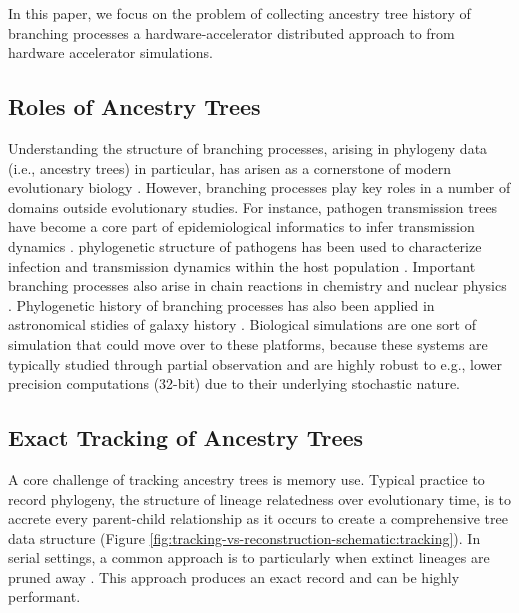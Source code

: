 In this paper, we focus on the problem of collecting ancestry tree history of branching processes a hardware-accelerator distributed approach to from hardware accelerator simulations.

\subsection{Roles of Ancestry Trees}

Understanding the structure of branching processes, arising in phylogeny data (i.e., ancestry trees) in particular, has arisen as a cornerstone of modern evolutionary biology \citep{faithConservationEvaluationPhylogenetic1992, STAMATAKIS2005phylogenetics,frenchHostPhylogenyShapes2023,kim2006discovery,lewinsohnStatedependentEvolutionaryModels2023a,lenski2003evolutionary}.
However, branching processes play key roles in a number of domains outside evolutionary studies.
For instance, pathogen transmission trees have become a core part of epidemiological informatics to infer transmission dynamics \citep{TODO}.
phylogenetic structure of pathogens has been used to characterize infection and transmission dynamics within the host population \citep{giardina2017inference,voznica2022deep}.
Important branching processes also arise in chain reactions in chemistry and nuclear physics \citep{UsonFornies1999,Pazsit2007}.
Phylogenetic history of branching processes has also been applied in astronomical stidies of galaxy history \citep{Jofr2017}.
Biological simulations are one sort of simulation that could move over to these platforms, because these systems are typically studied through partial observation and are highly robust to e.g., lower precision computations (32-bit) due to their underlying stochastic nature.

\subsection{Exact Tracking of Ancestry Trees}

A core challenge of tracking ancestry trees is memory use.
Typical practice to record phylogeny, the structure of lineage relatedness over evolutionary time, is to accrete every parent-child relationship as it occurs to create a comprehensive tree data structure \citep{moreno2024algorithms} (Figure \ref{fig:tracking-vs-reconstruction-schematic:tracking}).
In serial settings, a common approach is to particularly when extinct lineages are pruned away \citep{dolson2024phylotrackpy}.
This approach produces an exact record and can be highly performant.

